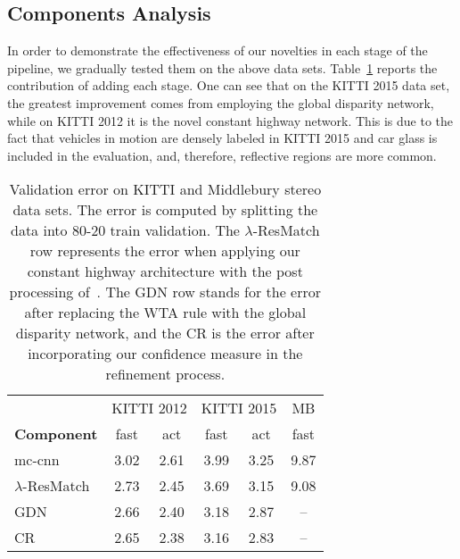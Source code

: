 \documentclass[10pt, twocolumn, letterpaper]{article}
\begin{document}
\subsection{Components Analysis}
\label{ablation}
In order to demonstrate the effectiveness of our novelties in each stage of the pipeline, we gradually tested them on the above data sets. Table~\ref{tab:main_results} reports the contribution of adding each stage. One can see that on the KITTI 2015 data set, the greatest improvement comes from employing the global disparity network, while on KITTI 2012 it is the novel constant highway network. This is due to the fact that vehicles in motion are densely labeled in KITTI 2015 and car glass is included in the evaluation, and, therefore, reflective regions are more common.

\begin{table}[t]
\begin{center}
\begin{tabular}{|lccccc|}
\hline
                         & \multicolumn{2}{l}{KITTI 2012} & \multicolumn{2}{l}{KITTI 2015} & MB \\ \cline{2-3} \cline{4-6} 
\textbf{Component}			& fast          & act			& fast	& act   	& fast    \\ \hline
mc-cnn~\cite{newlecun}		& 3.02          & 2.61         	& 3.99  & 3.25  	& 9.87	       \\
$\lambda$-ResMatch			& 2.73          & 2.45         	& 3.69  & 3.15   	& 9.08	\\
GDN 						& 2.66          & 2.40         	& 3.18  & 2.87    	& --		\\
CR       					& 2.65          & 2.38     		& 3.16   & 2.83   	& --		\\ \hline
\end{tabular}
\end{center}
\caption{Validation error on KITTI and Middlebury stereo data sets. The error is computed by splitting the data into 80-20 train validation. The $\lambda$-ResMatch row represents the error when applying our constant highway architecture with the post processing of~\cite{newlecun}. The GDN row stands for the error after replacing the WTA rule with the global disparity network, and the CR is the error after incorporating our confidence measure in the refinement process.}
\label{tab:main_results}
\end{table}
\end{document}

